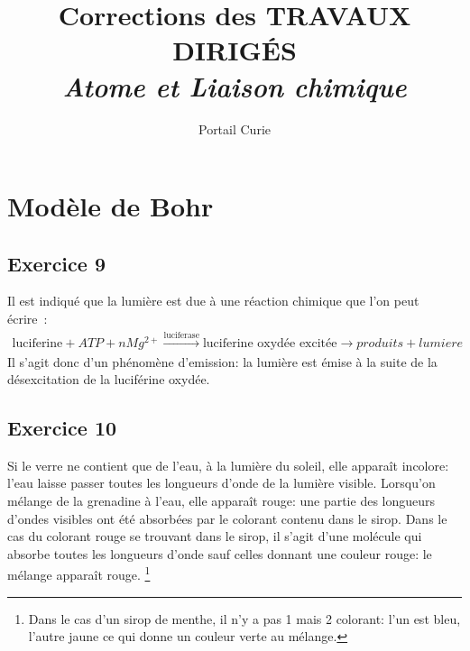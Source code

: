 \documentclass[12pt,french,dvips]{report}
\title{{\Huge Corrections des TRAVAUX DIRIG\'ES  \\[1.5cm] 
\textsl{Atome et Liaison chimique}}}
\author{Portail Curie}
\begin{document}
\section{Modèle de Bohr}
\subsection{Exercice 9}
Il est indiqué que la lumière est due à une réaction chimique que l'on peut écrire~:
\begin{align*}
\text{luciferine} + ATP + n Mg^{2+} \xrightarrow{\text{luciferase}} \text{luciferine oxydée excitée} \rightarrow produits + lumiere
\end{align*}
Il s'agit donc d'un phénomène d'emission: la lumière est émise à la suite de la désexcitation
de la luciférine oxydée.
\subsection{Exercice 10}
Si le verre ne contient que de l'eau, à la lumière du soleil, elle apparaît incolore: l'eau laisse
passer toutes les longueurs d'onde de la lumière visible.
Lorsqu'on mélange de la grenadine à l'eau, elle apparaît rouge: une partie des longueurs
d'ondes visibles ont été absorbées par le colorant contenu dans le sirop.
Dans le cas du colorant rouge se trouvant dans le sirop, il s'agit d'une molécule
qui absorbe toutes les longueurs d'onde sauf celles donnant une couleur rouge: le mélange apparaît rouge.%
\footnote{Dans le cas d'un sirop de menthe, il n'y a pas 1 mais 2 colorant: l'un est bleu, l'autre jaune
ce qui donne un couleur verte au mélange.}
\end{document}

